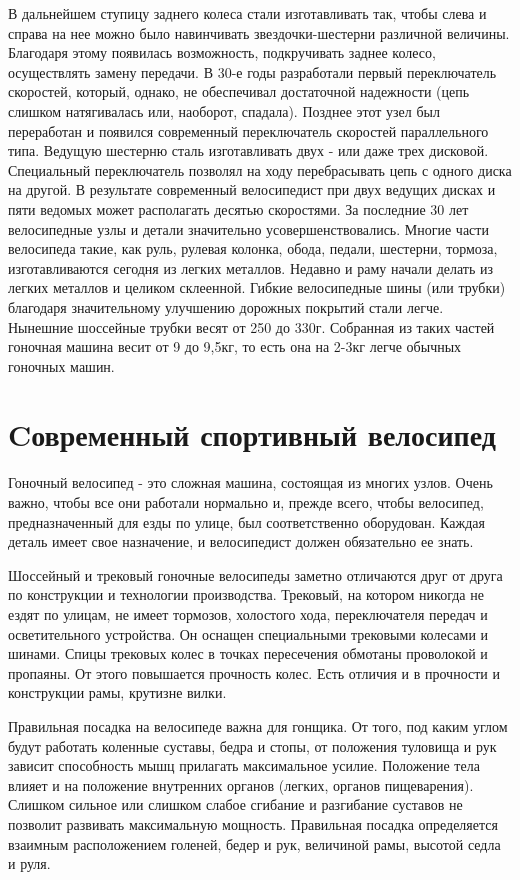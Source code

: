 \documentclass[a4paper,14pt]{extreport}
\begin{document}
В дальнейшем ступицу заднего колеса стали изготавливать так, чтобы слева и справа на нее можно было навинчивать звездочки-шестерни различной величины. Благодаря этому появилась возможность, подкручивать заднее колесо, осуществлять замену передачи. В 30-е годы разработали первый переключатель скоростей, который, однако, не обеспечивал достаточной надежности (цепь слишком натягивалась или, наоборот, спадала). Позднее этот узел был переработан и появился современный переключатель скоростей параллельного типа. Ведущую шестерню сталь изготавливать двух - или даже трех дисковой. Специальный переключатель позволял на ходу перебрасывать цепь с одного диска на другой. В результате современный велосипедист при двух ведущих дисках и пяти ведомых может располагать десятью скоростями. За последние 30 лет велосипедные узлы и детали значительно усовершенствовались. Многие части велосипеда такие, как руль, рулевая колонка, обода, педали, шестерни, тормоза, изготавливаются сегодня из легких металлов. Недавно и раму начали делать из легких металлов и целиком склеенной. Гибкие велосипедные шины (или трубки) благодаря значительному улучшению дорожных покрытий стали легче. Нынешние шоссейные трубки весят от 250 до 330г. Собранная из таких частей гоночная машина весит от 9 до 9,5кг, то есть она на 2-3кг легче обычных гоночных машин.

\chapter{Cовременный спортивный велосипед}
Гоночный велосипед - это сложная машина, состоящая из многих узлов. Очень важно, чтобы все они работали нормально и, прежде всего, чтобы велосипед, предназначенный для езды по улице, был соответственно оборудован. Каждая деталь имеет свое назначение, и велосипедист должен обязательно ее знать.

Шоссейный и трековый гоночные велосипеды заметно отличаются друг от друга по конструкции и технологии производства. Трековый, на котором никогда не ездят по улицам, не имеет тормозов, холостого хода, переключателя передач и осветительного устройства. Он оснащен специальными трековыми колесами и шинами. Спицы трековых колес в точках пересечения обмотаны проволокой и пропаяны. От этого повышается прочность колес. Есть отличия и в прочности и конструкции рамы, крутизне вилки.

Правильная посадка на велосипеде важна для гонщика. От того, под каким углом будут работать коленные суставы, бедра и стопы, от положения туловища и рук зависит способность мышц прилагать максимальное усилие. Положение тела влияет и на положение внутренних органов (легких, органов пищеварения). Слишком сильное или слишком слабое сгибание и разгибание суставов не позволит развивать максимальную мощность. Правильная посадка определяется взаимным расположением голеней, бедер и рук, величиной рамы, высотой седла и руля.
\end{document}

